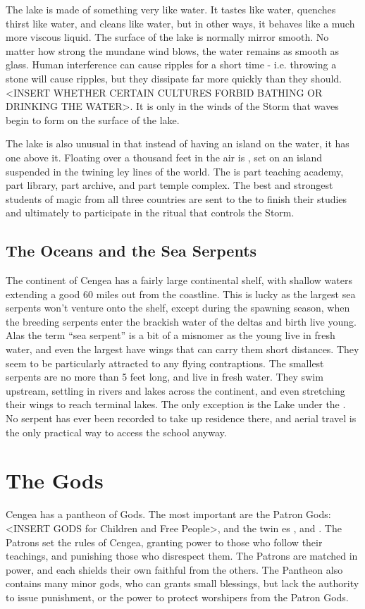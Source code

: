 \documentclass[blue]{GL2020}
\begin{document}
The lake is made of something very like water. It tastes like water, quenches thirst like water, and cleans like water, but in other ways, it behaves like a much more viscous liquid. The surface of the lake is normally mirror smooth. No matter how strong the mundane wind blows, the water remains as smooth as glass. Human interference can cause ripples for a short time - i.e. throwing a stone will cause ripples, but they dissipate far more quickly than they should. <INSERT WHETHER CERTAIN CULTURES FORBID BATHING OR DRINKING THE WATER>. It is only in the winds of the Storm that waves begin to form on the surface of the lake.

The lake is also unusual in that instead of having an island on the water, it has one above it. Floating over a thousand feet in the air is \pSchool{}, set on an island suspended in the twining ley lines of the world. The \pSchool{} is part teaching academy, part library, part archive, and part temple complex. The best and strongest students of magic from all three countries are sent to the \pSc{} to finish their studies and ultimately to participate in the ritual that controls the Storm.

\subsection*{The Oceans and the Sea Serpents}
The continent of Cengea has a fairly large continental shelf, with shallow waters extending a good 60 miles out from the coastline. This is lucky as the largest sea serpents won't venture onto the shelf, except during the spawning season, when the breeding serpents enter the brackish water of the deltas and birth live young. Alas the term ``sea serpent'' is a bit of a misnomer as the young live in fresh water, and even the largest have wings that can carry them short distances. They seem to be particularly attracted to any flying contraptions.  The smallest serpents are no more than 5 feet long, and live in fresh water. They swim upstream, settling in rivers and lakes across the continent, and even stretching their wings to reach terminal lakes. The only exception is the Lake under the \pSchool{}. No serpent has ever been recorded to take up residence there, and aerial travel is the only practical way to access the school anyway.

\section*{The Gods}
Cengea has a pantheon of Gods. The most important are the Patron Gods: <INSERT GODS for Children and Free People>, and the twin \cEbb{\God}es \cEbbFull{}, and \cFlowFull{}. The Patrons set the rules of Cengea, granting power to those who follow their teachings, and punishing those who disrespect them. The Patrons are matched in power, and each shields their own faithful from the others. The Pantheon also contains many minor gods, who can grants small blessings, but lack the authority to issue punishment, or the power to protect worshipers from the Patron Gods.
\end{document}
